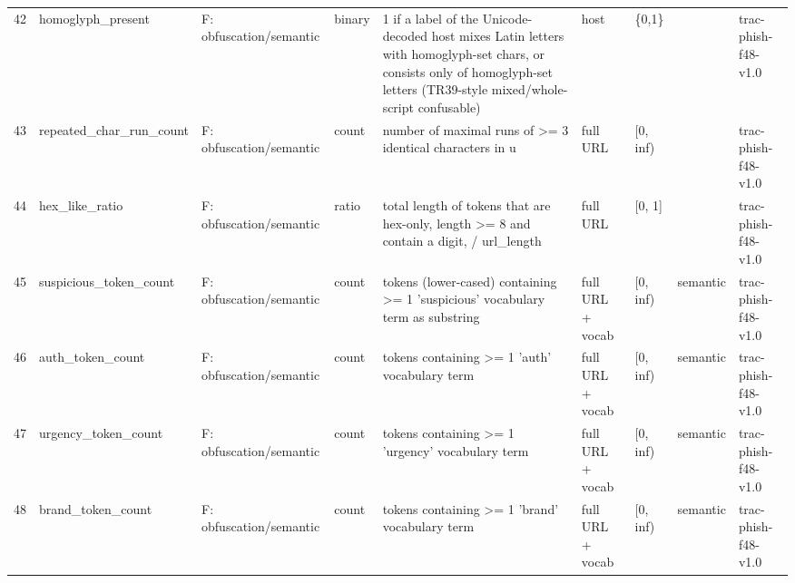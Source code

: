 \begin{tabular}{rllllllll}
42 & homoglyph\_present & F: obfuscation/semantic & binary & 1 if a label of the Unicode-decoded host mixes Latin letters with homoglyph-set chars, or consists only of homoglyph-set letters (TR39-style mixed/whole-script confusable) & host & \{0,1\} &  & trac-phish-f48-v1.0 \\
43 & repeated\_char\_run\_count & F: obfuscation/semantic & count & number of maximal runs of >= 3 identical characters in u & full URL & [0, inf) &  & trac-phish-f48-v1.0 \\
44 & hex\_like\_ratio & F: obfuscation/semantic & ratio & total length of tokens that are hex-only, length >= 8 and contain a digit, / url\_length & full URL & [0, 1] &  & trac-phish-f48-v1.0 \\
45 & suspicious\_token\_count & F: obfuscation/semantic & count & tokens (lower-cased) containing >= 1 'suspicious' vocabulary term as substring & full URL + vocab & [0, inf) & semantic & trac-phish-f48-v1.0 \\
46 & auth\_token\_count & F: obfuscation/semantic & count & tokens containing >= 1 'auth' vocabulary term & full URL + vocab & [0, inf) & semantic & trac-phish-f48-v1.0 \\
47 & urgency\_token\_count & F: obfuscation/semantic & count & tokens containing >= 1 'urgency' vocabulary term & full URL + vocab & [0, inf) & semantic & trac-phish-f48-v1.0 \\
48 & brand\_token\_count & F: obfuscation/semantic & count & tokens containing >= 1 'brand' vocabulary term & full URL + vocab & [0, inf) & semantic & trac-phish-f48-v1.0 \\
\bottomrule
\end{tabular}
